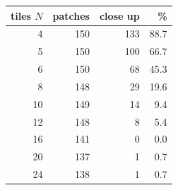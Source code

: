 \begin{tabular}{@{}rrrr@{}}
\toprule
tiles $N$ & patches & close up & \% \\
\midrule
4 & 150 & 133 & 88.7 \\
5 & 150 & 100 & 66.7 \\
6 & 150 & 68 & 45.3 \\
8 & 148 & 29 & 19.6 \\
10 & 149 & 14 & 9.4 \\
12 & 148 & 8 & 5.4 \\
16 & 141 & 0 & 0.0 \\
20 & 137 & 1 & 0.7 \\
24 & 138 & 1 & 0.7 \\
\bottomrule
\end{tabular}
